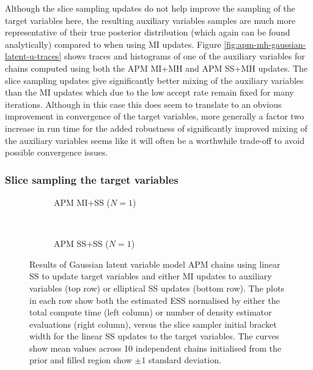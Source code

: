 Although the slice sampling updates do not help improve the sampling of the target variables here, the resulting auxiliary variables samples are much more representative of their true posterior distribution (which again can be found analytically) compared to when using \ac{MI} updates. Figure \ref{fig:apm-mh-gaussian-latent-u-traces} shows traces and histograms of one of the auxiliary variables for chains computed using both the \ac{APM} \ac{MI}+\ac{MH} and \ac{APM} \ac{SS}+\ac{MH} updates. The slice sampling updates give significantly better mixing of the auxiliary variables than the \ac{MI} updates which due to the low accept rate remain fixed for many iterations. Although in this case this does seem to translate to an obvious improvement in convergence of the target variables, more generally a factor two increase in run time for the added robustness of significantly improved mixing of the auxiliary variables seems like it will often be a worthwhile trade-off to avoid possible convergence issues.

\subsubsection{Slice sampling the target variables}

\begin{figure}
\centering
\begin{subfigure}[b]{\linewidth}
\centering
  \caption{\ac{APM} \ac{MI}+\ac{SS} ($N=1$)}
  \label{sfig:apm-mi-ss-1-gaussian-latent}
\end{subfigure}
\\[3mm]
\begin{subfigure}[b]{\linewidth}
\centering
  \caption{\ac{APM} \ac{SS}+\ac{SS} ($N=1$)}
  \label{sfig:apm-ss-ss-1-gaussian-latent}
\end{subfigure}
\caption[\acs{APM} \acs{SS} Gaussian model results.]{
Results of Gaussian latent variable model \acs{APM} chains using linear \ac{SS} to update target variables and either \ac{MI} updates to auxiliary variables (top row) or elliptical \ac{SS} updates (bottom row). The plots in each row show both the estimated \ac{ESS} normalised by either the total compute time (left column) or number of density estimator evaluations (right column), versus the slice sampler initial bracket width for the linear \ac{SS} updates to the target variables. The curves show mean values across 10 independent chains initialised from the prior and filled region show $\pm 1$ standard deviation.}
\label{fig:apm-ss-gaussian-latent-results}
\end{figure}

